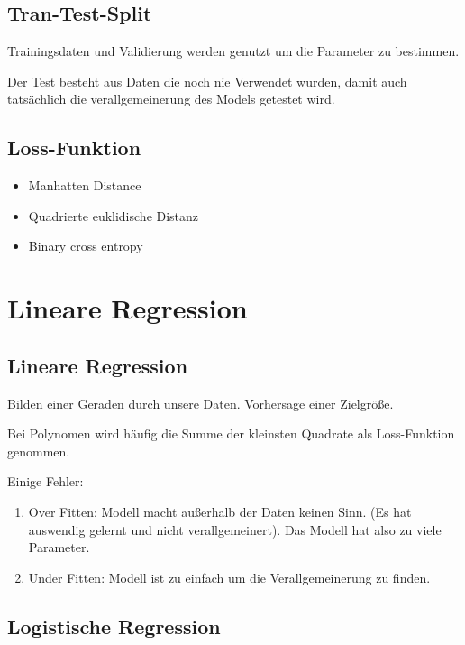 \documentclass[a4paper]{article}
\begin{document}
\subsection{Tran-Test-Split}

Trainingsdaten und Validierung werden genutzt um die Parameter zu bestimmen.

Der Test besteht aus Daten die noch nie Verwendet wurden, damit auch tatsächlich die verallgemeinerung des Models getestet wird.

\subsection{Loss-Funktion}

\begin{itemize}
    \item Manhatten Distance
    \item Quadrierte euklidische Distanz
    \item Binary cross entropy
\end{itemize}

\section{Lineare Regression}

\subsection{Lineare Regression}

Bilden einer Geraden durch unsere Daten. Vorhersage einer Zielgröße.

Bei Polynomen wird häufig die Summe der kleinsten Quadrate als Loss-Funktion genommen.

Einige Fehler:

\begin{enumerate}
    \item Over Fitten: Modell macht außerhalb der Daten keinen Sinn. (Es hat auswendig gelernt und nicht verallgemeinert). Das Modell hat also zu viele Parameter.
    \item Under Fitten: Modell ist zu einfach um die Verallgemeinerung zu finden.
\end{enumerate}

\subsection{Logistische Regression}

\end{document}
